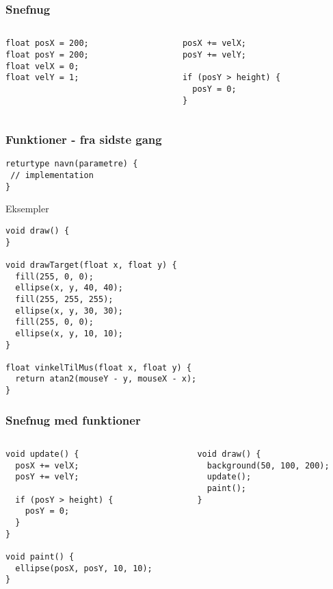 \documentclass{beamer}
\begin{document}
\begin{frame}[fragile]
  \frametitle{Snefnug}
  
  \begin{columns}
  \begin{column}{0.5\textwidth}
\begin{verbatim}
float posX = 200;
float posY = 200;
float velX = 0;
float velY = 1;
\end{verbatim}
  \end{column}
  \begin{column}{0.5\textwidth}
\begin{verbatim}
  posX += velX;
  posY += velY;
  
  if (posY > height) {
    posY = 0;
  }
\end{verbatim}  
  \end{column}
  \end{columns}

\end{frame}


\begin{frame}[fragile]
  \frametitle{Funktioner - fra sidste gang}
    
\begin{verbatim}
returtype navn(parametre) {
 // implementation
}
\end{verbatim}
  
  \begin{block}{Eksempler}
  {\tiny
\begin{verbatim}
void draw() {
}

void drawTarget(float x, float y) {
  fill(255, 0, 0);
  ellipse(x, y, 40, 40);
  fill(255, 255, 255);  
  ellipse(x, y, 30, 30);
  fill(255, 0, 0);
  ellipse(x, y, 10, 10);  
}

float vinkelTilMus(float x, float y) {
  return atan2(mouseY - y, mouseX - x);
}

\end{verbatim}    
}
  \end{block}

\end{frame}


\begin{frame}[fragile]
  \frametitle{Snefnug med funktioner}
 
  \begin{columns}
  \begin{column}{0.5\textwidth}
\begin{verbatim}
void update() {
  posX += velX;
  posY += velY;
  
  if (posY > height) {
    posY = 0;
  }
}

void paint() {
  ellipse(posX, posY, 10, 10);  
}
\end{verbatim}
  \end{column}
  \begin{column}{0.5\textwidth}
\begin{verbatim}
void draw() {
  background(50, 100, 200);
  update();
  paint();
}\end{verbatim}  
  \end{column}
  \end{columns}

\end{frame}
\end{document}
